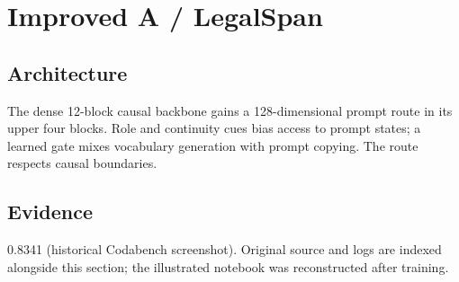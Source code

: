 \section{Improved A / LegalSpan}
\subsection{Architecture} The dense 12-block causal backbone gains a 128-dimensional prompt route in its upper four blocks. Role and continuity cues bias access to prompt states; a learned gate mixes vocabulary generation with prompt copying. The route respects causal boundaries.
\subsection{Evidence} 0.8341 (historical Codabench screenshot). Original source and logs are indexed alongside this section; the illustrated notebook was reconstructed after training.

